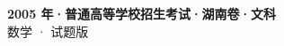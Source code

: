 \documentclass[zihao=-4, a4paper]{ctexart}
\begin{document}
\begin{center}
  {\Large\bfseries 2005 年·普通高等学校招生考试·湖南卷·文科}\\[4pt]
  {\large 数学 · 试题版}
\end{center}
\medskip
{}

\end{document}
